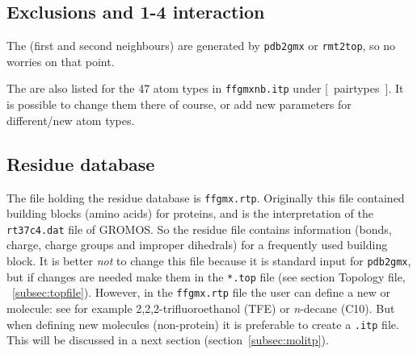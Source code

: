 \subsection{Exclusions and 1-4 interaction}
The  (first and second neighbours) are generated by
\verb'pdb2gmx' or \verb'rmt2top', so no worries on that point.

The  are also listed for the 47 atom types in
\verb'ffgmxnb.itp' under [~pairtypes~]. It is possible to change them there
of course, or add new parameters for different/new atom types.

\subsection{Residue database}
\label{subsec:rtp}
The file holding the residue database is {\tt ffgmx.rtp}. Originally
this file contained building blocks (amino acids) for proteins, and is
the {\gromacs} interpretation of the {\tt rt37c4.dat} file of GROMOS. So
the residue file contains information (bonds, charge, charge groups
and improper dihedrals) for a frequently used building block. It is
better {\em not} to change this file because it is standard input for
\verb'pdb2gmx', but if changes are needed make them in the
\verb'*.top' file (see section Topology file, ~\ref{subsec:topfile}). 
However, in the {\tt ffgmx.rtp} file the user can define a new
 or molecule: see for example 2,2,2-trifluoroethanol
(TFE) or {\em n}-decane (C10). But when defining new molecules
(non-protein) it is preferable to create a {\tt *.itp}
file. This will be discussed in a next section (section~\ref{subsec:molitp}).

